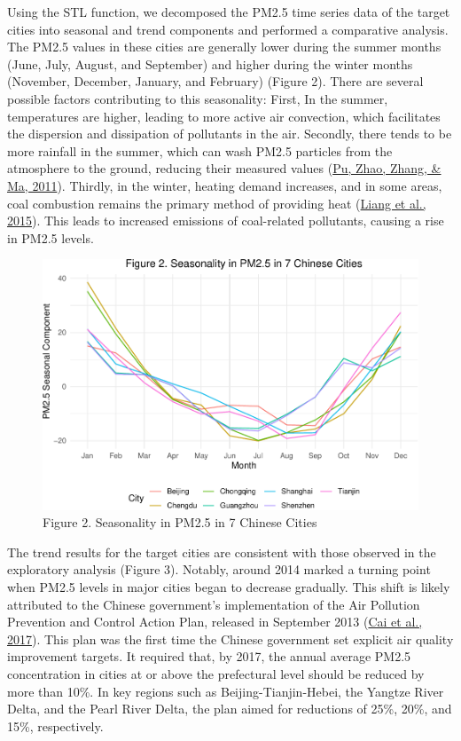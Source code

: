 \documentclass[
  12pt,
]{article}
\begin{document}
Using the STL function, we decomposed the PM2.5 time series data of the
target cities into seasonal and trend components and performed a
comparative analysis. The PM2.5 values in these cities are generally
lower during the summer months (June, July, August, and September) and
higher during the winter months (November, December, January, and
February) (Figure 2). There are several possible factors contributing to
this seasonality: First, In the summer, temperatures are higher, leading
to more active air convection, which facilitates the dispersion and
dissipation of pollutants in the air. Secondly, there tends to be more
rainfall in the summer, which can wash PM2.5 particles from the
atmosphere to the ground, reducing their measured values
(\protect\hyperlink{ref-rain}{Pu, Zhao, Zhang, \& Ma, 2011}). Thirdly,
in the winter, heating demand increases, and in some areas, coal
combustion remains the primary method of providing heat
(\protect\hyperlink{ref-heating}{Liang et al., 2015}). This leads to
increased emissions of coal-related pollutants, causing a rise in PM2.5
levels.

\begin{figure}
\centering
\includegraphics{LiFangRenZhang_ENV872_Project_files/figure-latex/seasonal figure-1.pdf}
\caption{Figure 2. Seasonality in PM2.5 in 7 Chinese Cities}
\end{figure}

The trend results for the target cities are consistent with those
observed in the exploratory analysis (Figure 3). Notably, around 2014
marked a turning point when PM2.5 levels in major cities began to
decrease gradually. This shift is likely attributed to the Chinese
government's implementation of the Air Pollution Prevention and Control
Action Plan, released in September 2013
(\protect\hyperlink{ref-plan}{Cai et al., 2017}). This plan was the
first time the Chinese government set explicit air quality improvement
targets. It required that, by 2017, the annual average PM2.5
concentration in cities at or above the prefectural level should be
reduced by more than 10\%. In key regions such as Beijing-Tianjin-Hebei,
the Yangtze River Delta, and the Pearl River Delta, the plan aimed for
reductions of 25\%, 20\%, and 15\%, respectively.
\end{document}
